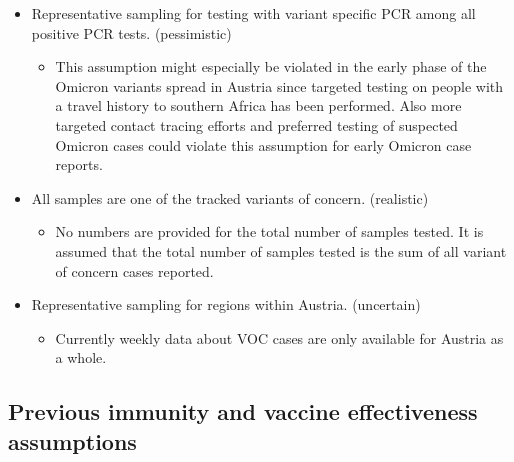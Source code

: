 \documentclass[
]{article}
\providecommand{\tightlist}{%
  \setlength{\itemsep}{0pt}\setlength{\parskip}{0pt}}
\begin{document}
\begin{itemize}
\tightlist
\item
  Representative sampling for testing with variant specific PCR among all positive PCR tests. (pessimistic)

  \begin{itemize}
  \tightlist
  \item
    This assumption might especially be violated in the early phase of the Omicron variants spread in Austria since targeted testing on people with a travel history to southern Africa has been performed. Also more targeted contact tracing efforts and preferred testing of suspected Omicron cases could violate this assumption for early Omicron case reports.
  \end{itemize}
\item
  All samples are one of the tracked variants of concern. (realistic)

  \begin{itemize}
  \tightlist
  \item
    No numbers are provided for the total number of samples tested.
    It is assumed that the total number of samples tested is the sum of all variant of concern cases reported.
  \end{itemize}
\item
  Representative sampling for regions within Austria. (uncertain)

  \begin{itemize}
  \tightlist
  \item
    Currently weekly data about VOC cases are only available for Austria as a whole.
  \end{itemize}
\end{itemize}

\hypertarget{previous-immunity-and-vaccine-effectiveness-assumptions}{%
\subsection{Previous immunity and vaccine effectiveness assumptions}\label{previous-immunity-and-vaccine-effectiveness-assumptions}}
\end{document}
